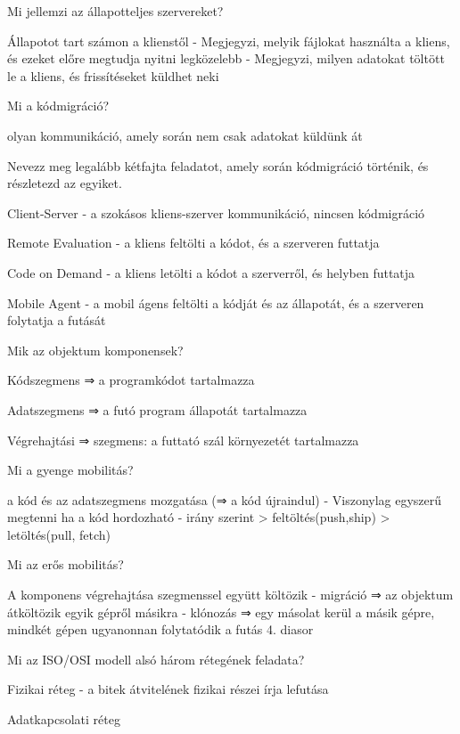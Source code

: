 \documentclass[twoside, a4paper, 12pt]{article}
\begin{document}
\begin{description}
    \item  Mi jellemzi az állapotteljes szervereket?
    \item Állapotot tart számon a klienstől
        - Megjegyzi, melyik fájlokat használta a kliens, és ezeket előre megtudja nyitni legközelebb
        - Megjegyzi, milyen adatokat töltött le a kliens, és frissítéseket küldhet neki
    \item  Mi a kódmigráció?
    \item olyan kommunikáció, amely során nem csak adatokat küldünk át
    \item  Nevezz meg legalább kétfajta feladatot, amely során kódmigráció történik, és részletezd az egyiket.
    \item Client-Server
        - a szokásos kliens-szerver kommunikáció, nincsen kódmigráció
    \item Remote Evaluation 
        - a kliens feltölti a kódot, és a szerveren futtatja
    \item Code on Demand 
        - a kliens letölti a kódot a szerverről, és helyben futtatja
    \item Mobile Agent 
        - a mobil ágens feltölti a kódját és az állapotát, és a szerveren folytatja a futását
    \item  Mik az objektum komponensek?
    \item Kódszegmens  ⇒ a programkódot tartalmazza
    \item Adatszegmens ⇒ a futó program állapotát tartalmazza
    \item Végrehajtási ⇒ szegmens: a futtató szál környezetét tartalmazza
    \item  Mi a gyenge mobilitás?
    \item a kód és az adatszegmens mozgatása (⇒ a kód újraindul)
        - Viszonylag egyszerű megtenni ha a kód hordozható
        - irány szerint
        > feltöltés(push,ship)
        > letöltés(pull, fetch)
    \item  Mi az erős mobilitás?
    \item A komponens végrehajtása szegmenssel együtt költözik
        - migráció ⇒ az objektum átköltözik egyik gépről másikra
        - klónozás ⇒ egy másolat kerül a másik gépre, mindkét gépen ugyanonnan folytatódik a futás
        4. diasor
    \item  Mi az ISO/OSI modell alsó három rétegének feladata?
    \item Fizikai réteg
        - a bitek átvitelének fizikai részei írja lefutása
    \item Adatkapcsolati réteg

\end{description}
\end{document}
